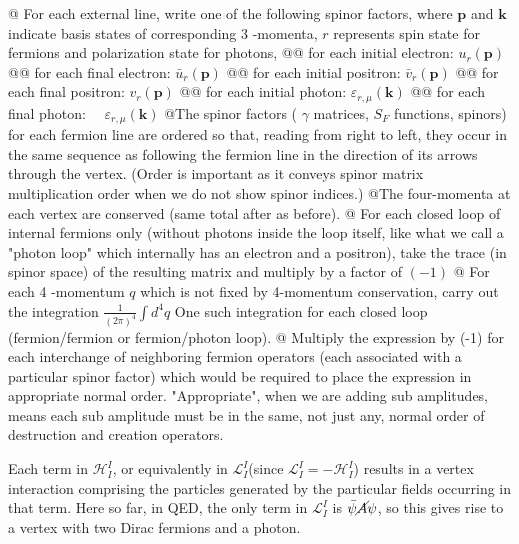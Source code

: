 \begin{itemize}
\begin{easylist}
    @ For each external line, write one of the following spinor factors, where $\mathbf{p}$ and $\mathbf{k}$ indicate basis states of corresponding 3 -momenta, $r$ represents spin state for fermions and polarization state for photons,
    @@ for each initial electron: $u_{r}(\mathbf{p})$
@@ for each final electron: $\bar{u}_{r}(\mathbf{p})$
@@ for each initial positron: $\bar{v}_{r}(\mathbf{p})$
@@ for each final positron: $v_{r}(\mathbf{p})$
@@ for each initial photon: $\varepsilon_{r, \mu}(\mathbf{k})$
@@ for each final photon: $\quad \varepsilon_{r, \mu}(\mathbf{k})$
@The spinor factors ( $\gamma$ matrices, $S_{F}$ functions, spinors) for each fermion line are ordered so that, reading from right to left, they occur in the same sequence as following the fermion line in the direction of its arrows through the vertex. (Order is important as it conveys spinor matrix multiplication order when we do not show spinor indices.)
@The four-momenta at each vertex are conserved (same total after as before).
@ For each closed loop of internal fermions only (without photons inside the loop itself, like what we call a "photon loop" which internally has an electron and a positron), take the trace (in spinor space) of the resulting matrix and multiply by a factor of $(-1)$
@ For each 4 -momentum $q$ which is not fixed by 4-momentum conservation, carry out the integration $\frac{1}{(2 \pi)^{4}} \int d^{4} q$ One such integration for each closed loop (fermion/fermion or fermion/photon loop).
@ Multiply the expression by (-1) for each interchange of neighboring fermion operators (each associated with a particular spinor factor) which would be required to place the expression in appropriate normal order. "Appropriate", when we are adding sub amplitudes, means each sub amplitude must be in the same, not just any, normal order of destruction and creation operators.
\end{easylist}
\end{itemize}
\begin{mybox}
Each term in $\mathcal{H}_I^I$, or equivalently in $\mathcal{L}_I^I$(since $\mathcal{L}_{I}^{I}=-\mathcal{H}_{I}^{I}$) results in a vertex interaction comprising the particles generated by the particular fields occurring in that term. Here so far, in QED, the only term in $\mathcal{L}_{I}^{I}$ is $\bar{\psi} \cancel{A} \psi$, so this gives rise to a vertex with two Dirac fermions and a photon.
\end{mybox}
